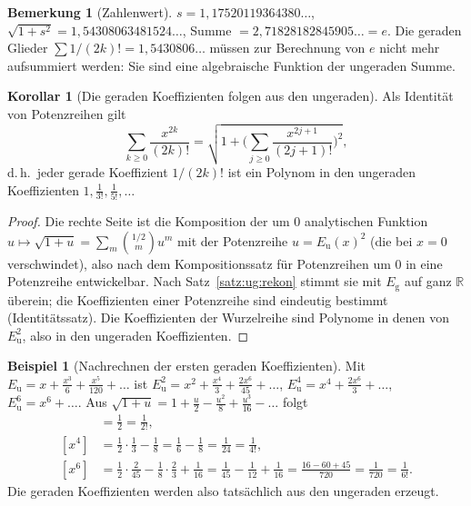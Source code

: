 \documentclass[a4paper,12pt,twoside]{report}
\theoremstyle{definition}
\newtheorem{beispiel}{Beispiel}
\newtheorem{korollar}{Korollar}
\newtheorem{bemerkung}{Bemerkung}
\begin{document}
\begin{bemerkung}[Zahlenwert]
$s=1{,}17520119364380\ldots$, $\sqrt{1+s^2}=1{,}54308063481524\ldots$, Summe $=2{,}71828182845905\ldots=e$. Die geraden Glieder $\sum 1/(2k)!=1{,}5430806\ldots$ müssen zur Berechnung von $e$ nicht mehr aufsummiert werden: Sie sind eine algebraische Funktion der ungeraden Summe.
\end{bemerkung}

\begin{korollar}[Die geraden Koeffizienten folgen aus den ungeraden]\label{kor:ug:koeff}
Als Identität von Potenzreihen gilt
\[
\sum_{k\ge0}\frac{x^{2k}}{(2k)!}=\sqrt{1+\Big(\sum_{j\ge0}\frac{x^{2j+1}}{(2j+1)!}\Big)^{2}} ,
\]
d.\,h.\ jeder gerade Koeffizient $1/(2k)!$ ist ein Polynom in den ungeraden Koeffizienten $1,\tfrac1{3!},\tfrac1{5!},\dots$
\end{korollar}

\begin{proof}
Die rechte Seite ist die Komposition der um $0$ analytischen Funktion $u\mapsto\sqrt{1+u}=\sum_m\binom{1/2}{m}u^m$ mit der Potenzreihe $u=E_{\mathrm u}(x)^2$ (die bei $x=0$ verschwindet), also nach dem Kompositionssatz für Potenzreihen um $0$ in eine Potenzreihe entwickelbar. Nach Satz~\ref{satz:ug:rekon} stimmt sie mit $E_{\mathrm g}$ auf ganz $\mathbb{R}$ überein; die Koeffizienten einer Potenzreihe sind eindeutig bestimmt (Identitätssatz). Die Koeffizienten der Wurzelreihe sind Polynome in denen von $E_{\mathrm u}^2$, also in den ungeraden Koeffizienten.
\end{proof}

\begin{beispiel}[Nachrechnen der ersten geraden Koeffizienten]
Mit $E_{\mathrm u}=x+\frac{x^3}{6}+\frac{x^5}{120}+\dots$ ist $E_{\mathrm u}^2=x^2+\frac{x^4}{3}+\frac{2x^6}{45}+\dots$, $E_{\mathrm u}^4=x^4+\frac{2x^6}{3}+\dots$, $E_{\mathrm u}^6=x^6+\dots$. Aus $\sqrt{1+u}=1+\frac u2-\frac{u^2}{8}+\frac{u^3}{16}-\dots$ folgt
\begin{align*}
[x^2]&=\tfrac12=\tfrac1{2!},\\
[x^4]&=\tfrac12\cdot\tfrac13-\tfrac18=\tfrac16-\tfrac18=\tfrac1{24}=\tfrac1{4!},\\
[x^6]&=\tfrac12\cdot\tfrac2{45}-\tfrac18\cdot\tfrac23+\tfrac1{16}=\tfrac1{45}-\tfrac1{12}+\tfrac1{16}=\tfrac{16-60+45}{720}=\tfrac1{720}=\tfrac1{6!}.
\end{align*}
Die geraden Koeffizienten werden also tatsächlich aus den ungeraden erzeugt.
\end{beispiel}
\end{document}

